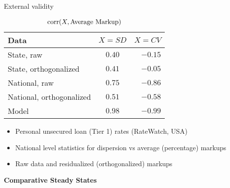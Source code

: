 \documentclass[10pt,english,slidetop,compress,
              blue,mathserif,color=option]{beamer}
\theoremstyle{plain}
\theoremstyle{definition}
\begin{document}
\begin{frame}{External validity}
    \begin{table}
      \caption{$\text{corr}(X, \textup{Average Markup})$}
      \begin{center}
        \begin{tabular}{ l | c | r }
          \toprule
          \textbf{Data}             & $X=SD$ & $X=CV$
          \\
          \hline
          State, raw                & $0.40$ & $-0.15$ 
          \\ 
          \hline
          State, orthogonalized     & $0.41$ & $-0.05$ 
          \\ 
          \hline
          National, raw             & $0.75$ & $-0.86$ 
          \\
          \hline
          National, orthogonalized  & $0.51$ & $-0.58$
          \\
          \hline
          Model                     & $0.98$ & $-0.99$
          \\
          \hline
          \hline
        \end{tabular}
      \end{center}
    \end{table}

    {
      \footnotesize
      \begin{itemize}
      \item Personal unsecured loan (Tier 1) rates (RateWatch, USA)
      \item National level statistics for dispersion vs average (percentage) markups
      \item Raw data and residualized (orthogonalized) markups
      \end{itemize}
    }

\end{frame}

{
  \begin{frame}
    \begin{center}
      \bigskip
      \bigskip

      {\Huge\bfseries{\color{orange}Comparative Steady States}}
      \bigskip

    \end{center}
  \end{frame}
}
\end{document}
